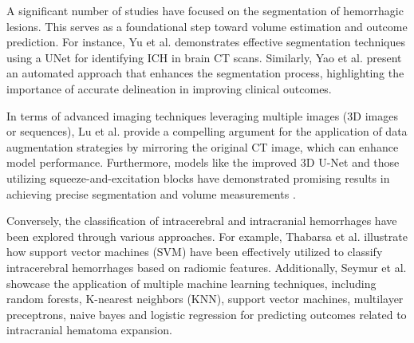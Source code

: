 

A significant number of studies have focused on the segmentation of hemorrhagic lesions. This serves as a foundational step toward volume estimation and outcome prediction. For instance, Yu et al. \cite{Yu2022} demonstrates effective segmentation techniques using a UNet for identifying ICH in brain CT scans. Similarly, Yao et al. \cite{YAO2020101910} present an automated approach that enhances the segmentation process, highlighting the importance of accurate delineation in improving clinical outcomes.


In terms of advanced imaging techniques leveraging multiple images (3D images or sequences), Lu et al. \cite{9210782} provide a compelling argument for the application of data augmentation strategies by mirroring the original CT image, which can enhance model performance. Furthermore, models like the improved 3D U-Net and those utilizing squeeze-and-excitation blocks have demonstrated promising results in achieving precise segmentation and volume measurements \cite{ABRAMOVA2021101908}.


Conversely, the classification of intracerebral and intracranial hemorrhages have been explored through various approaches. For example, Thabarsa et al. \cite{Thabarsa2023299} illustrate how support vector machines (SVM) have been effectively utilized to classify intracerebral hemorrhages based on radiomic features. Additionally, Seymur et al. \cite{Seymour2022} showcase the application of multiple machine learning techniques, including random forests, K-nearest neighbors (KNN), support vector machines, multilayer preceptrons, naive bayes and logistic regression for predicting outcomes related to intracranial hematoma expansion.

